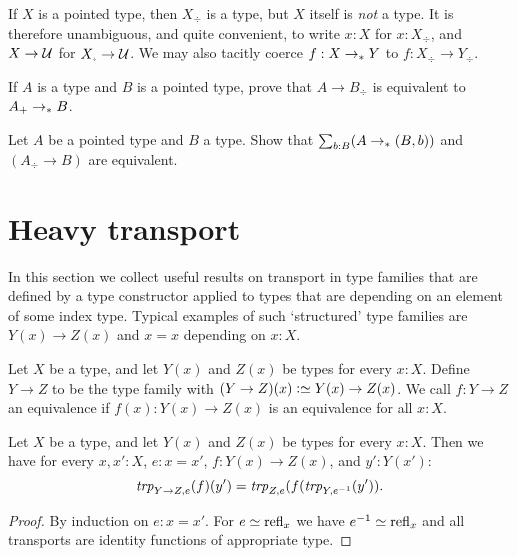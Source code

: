 If $X$ is a pointed type, then $X_\div $ is a type, but $X$ itself is
\emph{not} a type. It is therefore unambiguous, and quite convenient,
to write $x:X$ for $x:X_\div$, and $X\to{\mathcal{U}}$ for $X_\div\to\UU$.
We may also tacitly coerce $f:X\to_\ast Y$ to $f:X_\div \to Y_\div$.

\begin{xca}\label{xca:plusforgetadjoint}
If $A$ is a type and $B$ is a pointed type, 
prove that $A\to B_\div$ is equivalent to $A_+\to_\ast B$.
\end{xca}

\begin{xca}\label{xca:freemaps}
  Let $A$ be a pointed type and $B$ a type.  Show that  
$\sum_{b:B}(A\to_\ast (B,b))$ and $(A_\div\to B)$ are equivalent.
\end{xca}


\section{Heavy transport}
\label{sec:heavy-transport}

In this section we collect useful results on transport in
type families that are defined by a type constructor applied
to types that are depending on an element of some index type.
Typical examples of such `structured' type families are 
$Y(x)\to Z(x)$ and $x=x$ depending on $x:X$.

\begin{definition}\label{def:function-type-families}
Let $X$ be a type, and let $Y(x)$ and $Z(x)$ be types for every $x:X$.
Define $Y\to Z$ to be the type family with $(Y\to Z)(x) \defeq Y(x)\to Z(x)$.
We call $f:Y\to Z$ an equivalence if $f(x): Y(x)\to Z(x)$ is an
equivalence for all $x:X$.
\end{definition}

\begin{lemma}\label{lem:trp-in-function-type}
Let $X$ be a type, and let $Y(x)$ and $Z(x)$ be types for every $x:X$.
Then we have for every $x,x':X$, $e: x=x'$, $f: Y(x)\to Z(x)$, and $y':Y(x')$:
\[
\trp[Y\to Z]{ e} (f)(y') = \trp[Z]{e} (f(\trp[Y]{ e^{-1}}(y')).
\]
\end{lemma}
\begin{proof}
By induction on $e: x=x'$. For $e \jdeq \refl{x}$ we have $e^{-1}\jdeq \refl{x}$
and all transports are identity functions of appropriate type. 
\end{proof}

